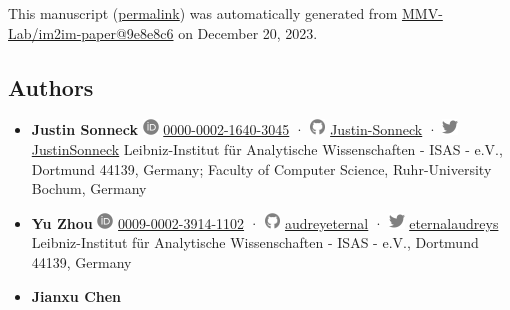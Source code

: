 This manuscript
(\href{https://MMV-Lab.github.io/im2im-paper/v/9e8e8c612f56fb5296c1a4e6be2cb6cd579e4008/}{permalink})
was automatically generated
from \href{https://github.com/MMV-Lab/im2im-paper/tree/9e8e8c612f56fb5296c1a4e6be2cb6cd579e4008}{MMV-Lab/im2im-paper@9e8e8c6}
on December 20, 2023.

\hypertarget{authors}{%
\subsection{Authors}\label{authors}}

\begin{itemize}
\item
  \textbf{Justin Sonneck}
  \includegraphics[width=0.16667in,height=0.16667in]{images/orcid.svg}
  \href{https://orcid.org/0000-0002-1640-3045}{0000-0002-1640-3045}
  · \includegraphics[width=0.16667in,height=0.16667in]{images/github.svg}
  \href{https://github.com/Justin-Sonneck}{Justin-Sonneck}
  · \includegraphics[width=0.16667in,height=0.16667in]{images/twitter.svg}
  \href{https://twitter.com/JustinSonneck}{JustinSonneck}
  Leibniz-Institut für Analytische Wissenschaften - ISAS - e.V., Dortmund 44139, Germany; Faculty of Computer Science, Ruhr-University Bochum, Germany
\item
  \textbf{Yu Zhou}
  \includegraphics[width=0.16667in,height=0.16667in]{images/orcid.svg}
  \href{https://orcid.org/0009-0002-3914-1102}{0009-0002-3914-1102}
  · \includegraphics[width=0.16667in,height=0.16667in]{images/github.svg}
  \href{https://github.com/audreyeternal}{audreyeternal}
  · \includegraphics[width=0.16667in,height=0.16667in]{images/twitter.svg}
  \href{https://twitter.com/eternalaudreys}{eternalaudreys}
  Leibniz-Institut für Analytische Wissenschaften - ISAS - e.V., Dortmund 44139, Germany
\item
  \textbf{Jianxu Chen}

\end{itemize}
